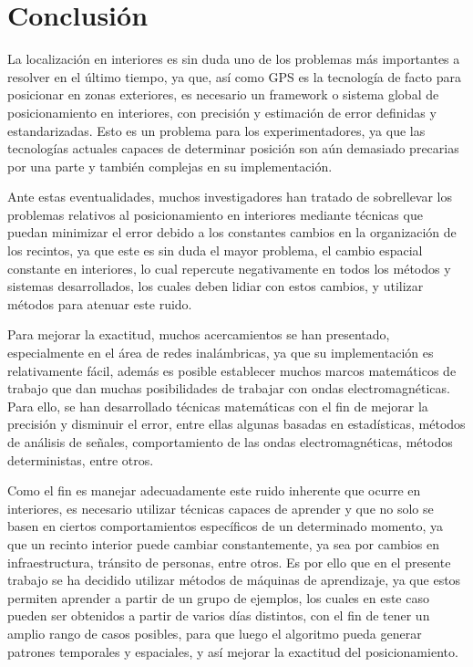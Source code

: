 
\chapter{Conclusión}

La localización en interiores es sin duda uno de los problemas más importantes a resolver en el último tiempo, ya que, así como GPS es la tecnología de facto para posicionar en zonas exteriores, es necesario un framework o sistema global de posicionamiento en interiores, con precisión y estimación de error definidas y estandarizadas. Esto es un problema para los experimentadores, ya que las tecnologías actuales capaces de determinar posición son aún demasiado precarias por una parte y también complejas en su implementación.

Ante estas eventualidades, muchos investigadores han tratado de sobrellevar los problemas relativos al posicionamiento en interiores mediante técnicas que puedan minimizar el error debido a los constantes cambios en la organización de los recintos, ya que este es sin duda el mayor problema, el cambio espacial constante en interiores, lo cual repercute negativamente en todos los métodos y sistemas desarrollados, los cuales deben lidiar con estos cambios, y utilizar métodos para atenuar este ruido.

Para mejorar la exactitud, muchos acercamientos se han presentado, especialmente en el área de redes inalámbricas, ya que su implementación es relativamente fácil, además es posible establecer muchos marcos matemáticos de trabajo que dan muchas posibilidades de trabajar con ondas electromagnéticas. Para ello, se han desarrollado técnicas matemáticas con el fin de mejorar la precisión y disminuir el error, entre ellas algunas basadas en estadísticas, métodos de análisis de señales, comportamiento de las ondas electromagnéticas, métodos deterministas, entre otros.

Como el fin es manejar adecuadamente este ruido inherente que ocurre en interiores, es necesario utilizar técnicas capaces de aprender y que no solo se basen en ciertos comportamientos específicos de un determinado momento, ya que un recinto interior puede cambiar constantemente, ya sea por cambios en infraestructura, tránsito de personas, entre otros. Es por ello que en el presente trabajo se ha decidido utilizar métodos de máquinas de aprendizaje, ya que estos permiten aprender a partir de un grupo de ejemplos, los cuales en este caso pueden ser obtenidos a partir de varios días distintos, con el fin de tener un amplio rango de casos posibles, para que luego el algoritmo pueda generar patrones temporales y espaciales, y así mejorar la exactitud del posicionamiento.

